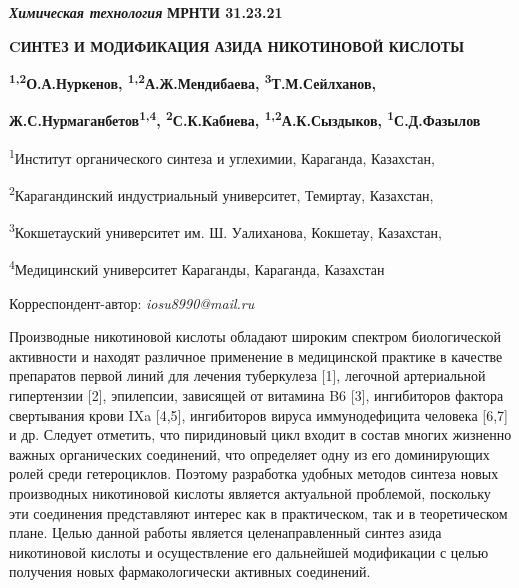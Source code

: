 \emph{{\bfseries Химическая технология}}\newpage
{\bfseries МРНТИ 31.23.21}

{\bfseries CИНТЕЗ И МОДИФИКАЦИЯ АЗИДА НИКОТИНОВОЙ КИСЛОТЫ}

{\bfseries \textsuperscript{1,2}О.А.Нуркенов,
\textsuperscript{1,2}А.Ж.Мендибаева, \textsuperscript{3}Т.М.Сейлханов,}

{\bfseries Ж.С.Нурмаганбетов\textsuperscript{1,4},
\textsuperscript{2}С.К.Кабиева, \textsuperscript{1,2}А.К.Сыздыков,
\textsuperscript{1}С.Д.Фазылов}

\textsuperscript{1}Институт органического синтеза и углехимии,
Караганда, Казахстан,

\textsuperscript{2}Карагандинский индустриальный университет, Темиртау,
Казахстан,

\textsuperscript{3}Кокшетауский университет им. Ш. Уалиханова, Кокшетау,
Казахстан,

\textsuperscript{4}Медицинский университет Караганды, Караганда,
Казахстан

Корреспондент-автор: \emph{iosu8990@mail.ru}

Производные никотиновой кислоты обладают широким спектром биологической
активности и находят различное применение в медицинской практике в
качестве препаратов первой линий для лечения туберкулеза {[}1{]},
легочной артериальной гипертензии {[}2{]}, эпилепсии, зависящей от
витамина B6 {[}3{]}, ингибиторов фактора свертывания крови IXa
{[}4,5{]}, ингибиторов вируса иммунодефицита человека {[}6,7{]} и др.
Следует отметить, что пиридиновый цикл входит в состав многих жизненно
важных органических соединений, что определяет одну из его доминирующих
ролей среди гетероциклов. Поэтому разработка удобных методов синтеза
новых производных никотиновой кислоты является актуальной проблемой,
поскольку эти соединения представляют интерес как в практическом, так и
в теоретическом плане. Целью данной работы является целенаправленный
синтез азида никотиновой кислоты и осуществление его дальнейшей
модификации с целью получения новых фармакологически активных
соединений.

